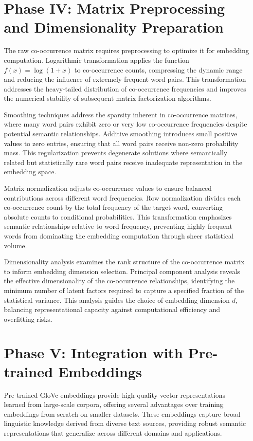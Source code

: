 \documentclass[11pt,a4paper]{article}
\begin{document}
\section{Phase IV: Matrix Preprocessing and Dimensionality Preparation}

The raw co-occurrence matrix requires preprocessing to optimize it for embedding computation. Logarithmic transformation applies the function $f(x) = \log(1 + x)$ to co-occurrence counts, compressing the dynamic range and reducing the influence of extremely frequent word pairs. This transformation addresses the heavy-tailed distribution of co-occurrence frequencies and improves the numerical stability of subsequent matrix factorization algorithms.

Smoothing techniques address the sparsity inherent in co-occurrence matrices, where many word pairs exhibit zero or very low co-occurrence frequencies despite potential semantic relationships. Additive smoothing introduces small positive values to zero entries, ensuring that all word pairs receive non-zero probability mass. This regularization prevents degenerate solutions where semantically related but statistically rare word pairs receive inadequate representation in the embedding space.

Matrix normalization adjusts co-occurrence values to ensure balanced contributions across different word frequencies. Row normalization divides each co-occurrence count by the total frequency of the target word, converting absolute counts to conditional probabilities. This transformation emphasizes semantic relationships relative to word frequency, preventing highly frequent words from dominating the embedding computation through sheer statistical volume.

Dimensionality analysis examines the rank structure of the co-occurrence matrix to inform embedding dimension selection. Principal component analysis reveals the effective dimensionality of the co-occurrence relationships, identifying the minimum number of latent factors required to capture a specified fraction of the statistical variance. This analysis guides the choice of embedding dimension $d$, balancing representational capacity against computational efficiency and overfitting risks.

\section{Phase V: Integration with Pre-trained Embeddings}

Pre-trained GloVe embeddings provide high-quality vector representations learned from large-scale corpora, offering several advantages over training embeddings from scratch on smaller datasets. These embeddings capture broad linguistic knowledge derived from diverse text sources, providing robust semantic representations that generalize across different domains and applications.
\end{document}
